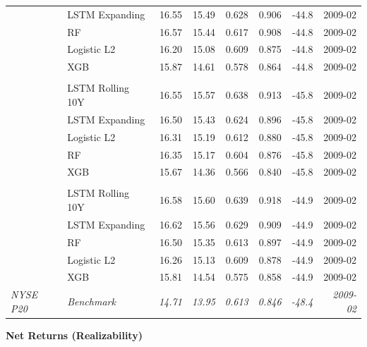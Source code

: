 \begin{landscape}
\begin{table}[htbp]
\begin{minipage}[t]{0.47\linewidth}
{\begin{tabular}{l l r r r r r r}
 & LSTM Expanding & 16.55 & 15.49 & 0.628 & 0.906 & -44.8 & 2009-02 \\
 & RF & 16.57 & 15.44 & 0.617 & 0.908 & -44.8 & 2009-02 \\
 & Logistic L2 & 16.20 & 15.08 & 0.609 & 0.875 & -44.8 & 2009-02 \\
 & XGB & 15.87 & 14.61 & 0.578 & 0.864 & -44.8 & 2009-02 \\
\addlinespace[0.15cm]
\multicolumn{8}{l}{\textit{\textbf{EWMA $\beta$}}} \\
 & LSTM Rolling 10Y & 16.55 & 15.57 & 0.638 & 0.913 & -45.8 & 2009-02 \\
 & LSTM Expanding & 16.50 & 15.43 & 0.624 & 0.896 & -45.8 & 2009-02 \\
 & Logistic L2 & 16.31 & 15.19 & 0.612 & 0.880 & -45.8 & 2009-02 \\
 & RF & 16.35 & 15.17 & 0.604 & 0.876 & -45.8 & 2009-02 \\
 & XGB & 15.67 & 14.36 & 0.566 & 0.840 & -45.8 & 2009-02 \\
\addlinespace[0.15cm]
\multicolumn{8}{l}{\textit{\textbf{Kalman $\beta$}}} \\
 & LSTM Rolling 10Y & 16.58 & 15.60 & 0.639 & 0.918 & -44.9 & 2009-02 \\
 & LSTM Expanding & 16.62 & 15.56 & 0.629 & 0.909 & -44.9 & 2009-02 \\
 & RF & 16.50 & 15.35 & 0.613 & 0.897 & -44.9 & 2009-02 \\
 & Logistic L2 & 16.26 & 15.13 & 0.609 & 0.878 & -44.9 & 2009-02 \\
 & XGB & 15.81 & 14.54 & 0.575 & 0.858 & -44.9 & 2009-02 \\
\addlinespace[0.15cm]
\midrule
\textit{NYSE P20} & \textit{Benchmark} & \textit{14.71} & \textit{13.95} & \textit{0.613} & \textit{0.846} & \textit{-48.4} & \textit{2009-02} \\
\bottomrule
\end{tabular}}
\end{minipage}%
\hspace{0.5cm}%
\begin{minipage}[t]{0.47\linewidth}
\centering
\textbf{\normalsize Net Returns (Realizability)}
\vspace{0.2cm}


\end{minipage}
\end{table}
\end{landscape}
